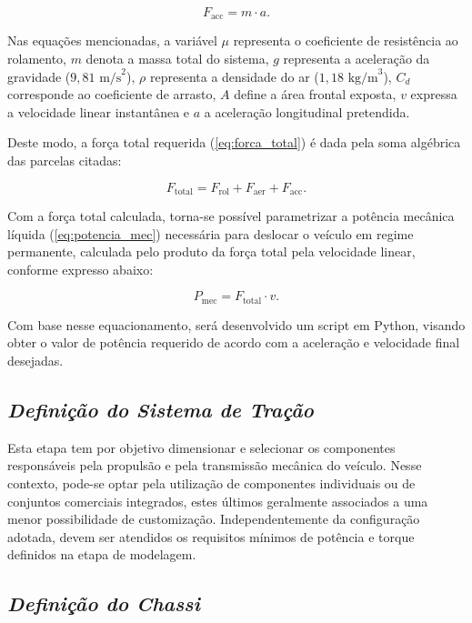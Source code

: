 \documentclass[conference]{IEEEtran}
\begin{document}
\begin{equation}
    F_{\text{acc}} = m \cdot a.
    \label{eq:forca_acc}
\end{equation}

Nas equações mencionadas, a variável $\mu$ representa o coeficiente de resistência ao rolamento, $m$ denota a massa total do sistema, $g$ representa a aceleração da gravidade ($9{,}81\text{ m/s}^2$), $\rho$ representa a densidade do ar ($1{,}18\text{ kg/m}^3$), $C_d$ corresponde ao coeficiente de arrasto, $A$ define a área frontal exposta, $v$ expressa a velocidade linear instantânea e $a$ a aceleração longitudinal pretendida. 

Deste modo, a força total requerida (\ref{eq:forca_total}) é dada pela soma algébrica das parcelas citadas:

\begin{equation}
    F_{\text{total}} = F_{\text{rol}} + F_{\text{aer}} + F_{\text{acc}}.
    \label{eq:forca_total}
\end{equation}

Com a força total calculada, torna-se possível parametrizar a potência mecânica líquida (\ref{eq:potencia_mec}) necessária para deslocar o veículo em regime permanente, calculada pelo produto da força total pela velocidade linear, conforme expresso abaixo:

\begin{equation}
    P_{\text{mec}} = F_{\text{total}} \cdot v.
    \label{eq:potencia_mec}
\end{equation}

Com base nesse equacionamento, será desenvolvido um script em Python, visando obter o valor de potência requerido de acordo com a aceleração e velocidade final desejadas.


\subsection{\textit{Definição do Sistema de Tração}}

Esta etapa tem por objetivo dimensionar e selecionar os componentes responsáveis pela propulsão e pela transmissão mecânica do veículo. Nesse contexto, pode-se optar pela utilização de componentes individuais ou de conjuntos comerciais integrados, estes últimos geralmente associados a uma menor possibilidade de customização. Independentemente da configuração adotada, devem ser atendidos os requisitos mínimos de potência e torque definidos na etapa de modelagem.


\subsection{\textit{Definição do Chassi}}
\end{document}
